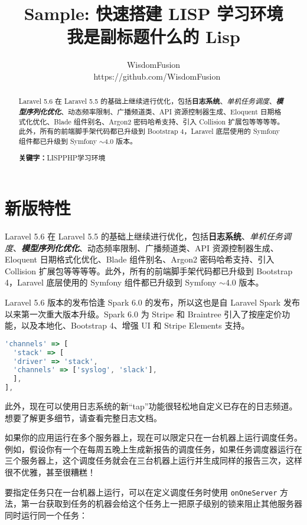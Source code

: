 \documentclass{progartcn}
\title{\bfseries\sffamily
  Sample: 快速搭建 LISP 学习环境\\
  \normalfont\zihao{-3}
  我是副标题什么的 Lisp
}
\author{WisdomFusion \\ \faGithubAlt~ https://github.com/WisdomFusion}
\date{}
\begin{document}
\maketitle
\thispagestyle{empty}


\begin{abstract}
\noindent Laravel 5.6 在 Laravel 5.5 的基础上继续进行优化，包括\textbf{日志系统}、\textit{单机任务调度}、\textbf{\textit{模型序列化优化}}、动态频率限制、广播频道类、API 资源控制器生成、Eloquent 日期格式化优化、Blade 组件别名、Argon2 密码哈希支持、引入 Collision 扩展包等等等等。此外，所有的前端脚手架代码都已升级到 Bootstrap 4，Laravel 底层使用的 Symfony 组件都已升级到 Symfony $\sim$4.0 版本。

\vspace{2ex}
\noindent \textbf{关键字：}LISP\quad{}PHP\quad{}学习环境
\end{abstract}

\section{新版特性}
\label{newfeatures}

Laravel 5.6 在 Laravel 5.5 的基础上继续进行优化，包括\textbf{日志系统}、\textit{单机任务调度}、\textbf{\textit{模型序列化优化}}、动态频率限制、广播频道类、API 资源控制器生成、Eloquent 日期格式化优化、Blade 组件别名、Argon2 密码哈希支持、引入 Collision 扩展包等等等等。此外，所有的前端脚手架代码都已升级到 Bootstrap 4，Laravel 底层使用的 Symfony 组件都已升级到 Symfony $\sim$4.0 版本。

Laravel 5.6 版本的发布恰逢 Spark 6.0 的发布，所以这也是自 Laravel Spark 发布以来第一次重大版本升级。Spark 6.0 为 Stripe 和 Braintree 引入了按座定价功能，以及本地化、Bootstrap 4、增强 UI 和 Stripe Elements 支持。


\begin{lstlisting}[language=JavaScript,caption={test/test.json}]
'channels' => [
  'stack' => [
  'driver' => 'stack',
  'channels' => ['syslog', 'slack'],
  ],
],
\end{lstlisting}

此外，现在可以使用日志系统的新``tap''功能很轻松地自定义已存在的日志频道。想要了解更多细节，请查看完整日志文档。

如果你的应用运行在多个服务器上，现在可以限定只在一台机器上运行调度任务。例如，假设你有一个在每周五晚上生成新报告的调度任务，如果任务调度器运行在三个服务器上，这个调度任务就会在三台机器上运行并生成同样的报告三次，这样很不优雅，甚至很糟糕！

要指定任务只在一台机器上运行，可以在定义调度任务时使用 \verb|onOneServer| 方法，第一台获取到任务的机器会给这个任务上一把原子级别的锁来阻止其他服务器同时运行同一个任务：
\end{document}
